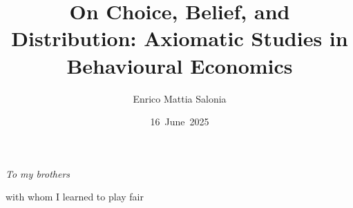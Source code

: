 \documentclass[12pt, a4paper]{report}
\title{On Choice, Belief, and Distribution: Axiomatic Studies in Behavioural Economics}
\author{Enrico Mattia Salonia}
\date{16~June~2025}  %
\begin{document}

\begin{titlepage}
	\centering
	\makeatletter                   %
	{\LARGE\bfseries \@title\par}\vspace{2cm}


	{\Large\bfseries \@author\par}\vspace{0.5cm}  %

	{\@date}                        %
	\makeatother                    %
\end{titlepage}


\cleardoublepage


\cleardoublepage          %
\thispagestyle{empty}     %


\vspace*{0.55\textheight}     %
\begin{flushright}
	\itshape                   %
	To my brothers\par
	with whom I learned to play fair
\end{flushright}


\addtocounter{page}{-1}

\setcounter{page}{2} %
\tableofcontents
\cleardoublepage


\setcounter{chapter}{0}%

\setcounter{chapter}{0}%




\appendix








\end{document}
